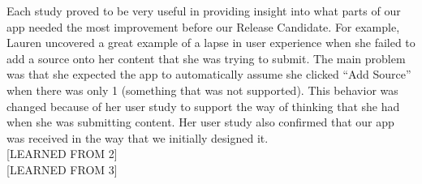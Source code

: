 \documentclass[11pt]{article}
\begin{document}
Each study proved to be very useful in providing insight into what parts of our app needed the most improvement before our Release Candidate. For example, Lauren uncovered a great example of a lapse in user experience when she failed to add a source onto her content that she was trying to submit. The main problem was that she expected the app to automatically assume she clicked ``Add Source'' when there was only 1 (something that was not supported). This behavior was changed because of her user study to support the way of thinking that she had when she was submitting content. Her user study also confirmed that our app was received in the way that we initially designed it.\\[-9pt]

[LEARNED FROM 2]\\[-9pt]

[LEARNED FROM 3]\\
\end{document}
